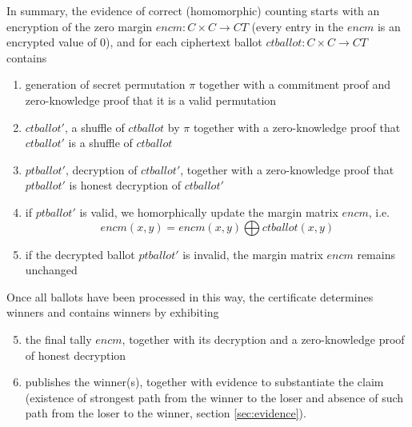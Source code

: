 In summary, the evidence of correct (homomorphic) counting starts
with an encryption of the zero margin $encm : C \times C \to CT$ (every entry in 
the $encm$ is an encrypted value of 0), and for each
ciphertext ballot $ctballot : C \times C \to CT $ contains
\begin{enumerate}
\item generation of secret permutation $\pi$  together with a commitment proof and zero-knowledge proof that it is a valid permutation
\item \label{it:shuff} $ctballot'$, a shuffle of $ctballot$ by $\pi$ together with a zero-knowledge proof that $ctballot'$ is a shuffle of $ctballot$
\item $ptballot'$, decryption of $ctballot'$, together with a zero-knowledge proof that  $ptballot'$ is  honest decryption of $ctballot'$
\item \label{it:upd-marg}  if $ptballot'$ is valid,  we homorphically  update the margin matrix $encm$,  i.e.   \[ encm(x, y) = encm(x, y) \bigoplus  ctballot(x, y) \]
\item  if the decrypted ballot $ptballot'$ is invalid,  the margin matrix $encm$ remains unchanged
\setcounter{mycnt}{\value{enumi}}
\end{enumerate}
Once all ballots have been processed in this way, the certificate
determines winners and contains
winners by exhibiting
\begin{enumerate}
\setcounter{enumi}{4}
\item \label{it:pub-dm} the final tally $encm$, together with its decryption  
  and a zero-knowledge proof of honest decryption     
\item publishes the winner(s), together with evidence to substantiate the claim (existence of strongest path from the winner to the loser 
and absence of such path from the loser to the winner,  section \ref{sec:evidence}).
\end{enumerate}

